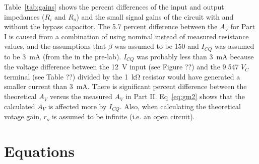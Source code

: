 Table~\ref{tab:gains} shows the percent differences of the input and output impedances ($R_i$ and $R_o$) and the small signal gains of the circuit with and without the bypass capacitor.
The 5.7 percent difference between the $A_V$ for Part I is caused from a combination of using nominal instead of measured resistance values, and the assumptions that $\beta$ was assumed to be 150 and  $I_{CQ}$ was assumed to be \SI{3}{mA} (from the in the pre-lab). $I_{CQ}$ was probably less than \SI{3}{mA} because the voltage difference between the \SI{12}{V} input (see Figure ??) and the 9.547 $V_C$ terminal (see Table ??) divided by the \SI{1}{\kilo\ohm} resistor would have generated a smaller current than \SI{3}{mA}. There is significant percent difference between the theoretical $A_V$ versus the measured $A_V$ in Part II. Eq~\ref{eq:gm2} shows that the calculated $A_V$ is affected more by $I_{CQ}$. Also, when calculating the theoretical votage gain, $r_o$ is assumed to be infinite (i.e. an open circuit). %


\section{Equations}

